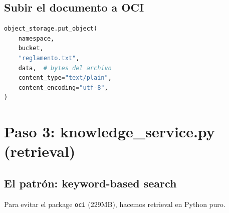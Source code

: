 \documentclass[11pt,a4paper,oneside]{article}
\begin{document}
\subsection{Subir el documento a OCI}

\begin{lstlisting}[language=Python,caption={Upload to OCI}]
object_storage.put_object(
    namespace,
    bucket,
    "reglamento.txt",
    data,  # bytes del archivo
    content_type="text/plain",
    content_encoding="utf-8",
)
\end{lstlisting}

\section{Paso 3: knowledge\_service.py (retrieval)}

\subsection{El patr\'on: keyword-based search}

Para evitar el package \texttt{oci} (229MB), hacemos retrieval en Python puro.
\end{document}
